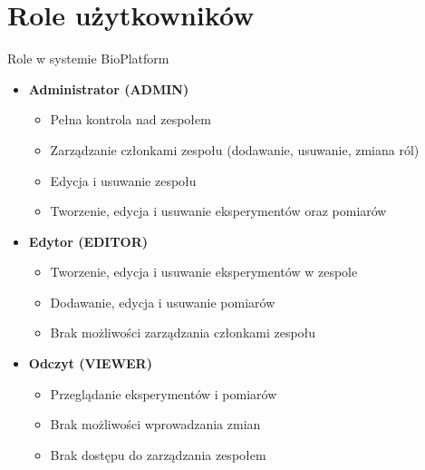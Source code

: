 \documentclass[polish,aspectratio=1610]{beamer}
\begin{document}
    \section{Role użytkowników}
    \begin{frame}{Role w systemie BioPlatform}
        \begin{itemize}
            \item \textbf{Administrator (ADMIN)}
            \begin{itemize}
                \item Pełna kontrola nad zespołem
                \item Zarządzanie członkami zespołu (dodawanie, usuwanie, zmiana ról)
                \item Edycja i usuwanie zespołu
                \item Tworzenie, edycja i usuwanie eksperymentów oraz pomiarów
            \end{itemize}
            \item \textbf{Edytor (EDITOR)}
            \begin{itemize}
                \item Tworzenie, edycja i usuwanie eksperymentów w zespole
                \item Dodawanie, edycja i usuwanie pomiarów
                \item Brak możliwości zarządzania członkami zespołu
            \end{itemize}
            \item \textbf{Odczyt (VIEWER)}
            \begin{itemize}
                \item Przeglądanie eksperymentów i pomiarów
                \item Brak możliwości wprowadzania zmian
                \item Brak dostępu do zarządzania zespołem
            \end{itemize}
        \end{itemize}
    \end{frame}

\end{document}

